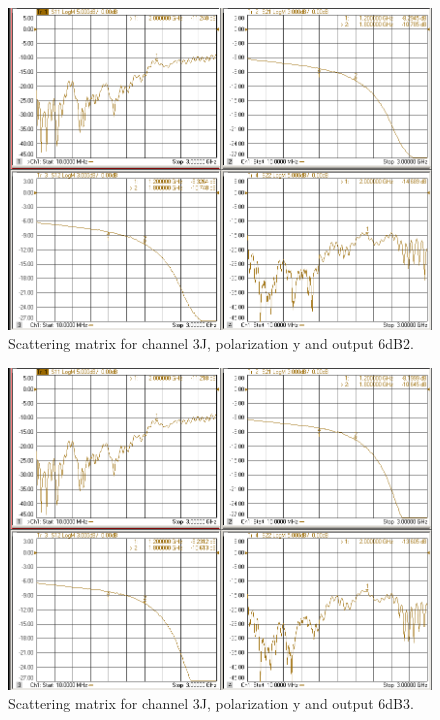 \documentclass[12pt,a4paper,oneside]{article}
\begin{document}
\begin{figure}[H]
\centering
\includegraphics[width=0.9\linewidth]{VNA_results/3Jy_6dB2.png}
\caption{Scattering matrix for channel 3J, polarization y and output 6dB2.}
\label{fig:3Jy_6dB2}
\end{figure}


\begin{figure}[H]
\centering
\includegraphics[width=0.9\linewidth]{VNA_results/3Jy_6dB3.png}
\caption{Scattering matrix for channel 3J, polarization y and output 6dB3.}
\label{fig:3Jy_6dB3}
\end{figure}
\end{document}
